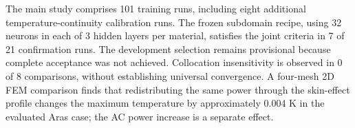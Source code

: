 The main study comprises 101 training runs, including eight additional temperature-continuity calibration runs. The frozen subdomain recipe, using 32 neurons in each of 3 hidden layers per material, satisfies the joint criteria in 7 of 21 confirmation runs. The development selection remains provisional because complete acceptance was not achieved. Collocation insensitivity is observed in 0 of 8 comparisons, without establishing universal convergence. A four-mesh 2D FEM comparison finds that redistributing the same power through the skin-effect profile changes the maximum temperature by approximately 0.004 K in the evaluated Aras case; the AC power increase is a separate effect.
